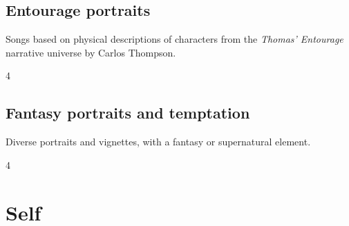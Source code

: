\documentclass[a4paper,landscape]{memoir}
\begin{document}
\chapter{Entourage portraits}
Songs based on physical descriptions of characters from the \emph{Thomas' Entourage} narrative universe by Carlos Thompson.
\clearpage\begin{multicols*}{4}
















\end{multicols*}

\chapter{Fantasy portraits and temptation}
Diverse portraits and vignettes, with a fantasy or supernatural element.
\clearpage\begin{multicols*}{4}
















\end{multicols*}

\part{Self}
\end{document}

